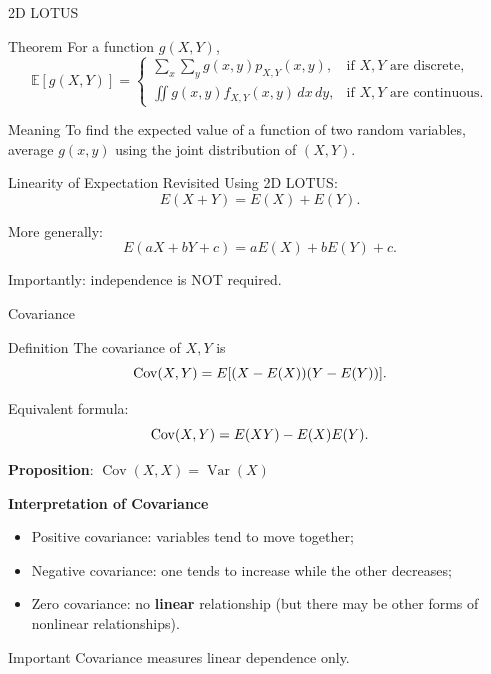 \begin{frame}{2D LOTUS}
\begin{keybox}{Theorem}
For a function \(g(X,Y)\),
\[
\mathbb{E}[g(X,Y)]
=
\begin{cases}
\displaystyle
\sum_x\sum_y g(x,y)p_{X,Y}(x,y),
& \text{if } X,Y \text{ are discrete},\\[12pt]
\displaystyle
\iint g(x,y)f_{X,Y}(x,y)\,dx\,dy,
& \text{if } X,Y \text{ are continuous}.
\end{cases}
\]
\end{keybox}

\vspace{0.2cm}

\begin{keybox}{Meaning}
To find the expected value of a function of two random variables, average \(g(x,y)\) using the joint distribution of \((X,Y)\).
\end{keybox}
\end{frame}



\begin{frame}{Linearity of Expectation Revisited}
Using 2D LOTUS:
\[
E(X+Y)
=
E(X)+E(Y).
\]

More generally:
\[
{
E(aX+bY+c)
=
aE(X)+bE(Y)+c.
}
\]

\vspace{0.25cm}

Importantly:
independence is NOT required.
\end{frame}


\begin{frame}{Covariance}
\begin{keybox}{Definition}
The covariance of \(X,Y\) is
\[
{
\operatorname{Cov}(X,Y)
=
E[(X-E(X))(Y-E(Y))].
}
\]
\end{keybox}

Equivalent formula:
\[
{
\operatorname{Cov}(X,Y)
=
E(XY)-E(X)E(Y).
}
\]

\textbf{Proposition}: $\operatorname{Cov}(X,X) = \operatorname{Var}(X)$
\vspace{2mm}

\textbf{Interpretation of Covariance}
\begin{itemize}
    \item Positive covariance:
    variables tend to move together;

    \item Negative covariance:
    one tends to increase while the other decreases;

    \item Zero covariance:
    no \textbf{linear} relationship (but there may be other forms of nonlinear relationships).
\end{itemize}

\vspace{0.25cm}

\begin{keybox}{Important}
Covariance measures linear dependence only.
\end{keybox}

\end{frame}



